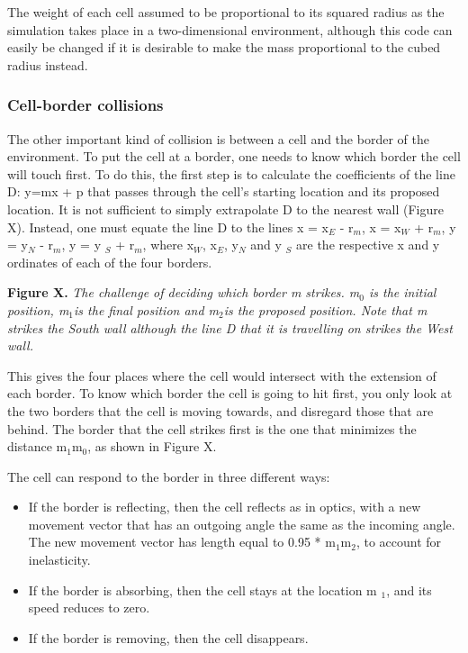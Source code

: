 \documentclass[11.5pt]{article}
\begin{document}
The weight of each cell assumed to be proportional to its squared radius 
as the simulation takes place in a two-dimensional environment, although 
this code can easily be changed if it is desirable to make the mass 
proportional to the cubed radius instead.



\subsubsection{Cell-border collisions}
The other important kind of collision is between a cell and the border 
of the environment. To put the cell at a border, one needs to know which 
border the cell will touch first. To do this, the first step is to 
calculate the coefficients of the line D: y=mx + p that passes through 
the cell's starting location and its proposed location. It is not 
sufficient to simply extrapolate D to the nearest wall (Figure X). 
Instead, one must equate the line D to the lines x = x$_{E}$ - r$_{
m}$, x = x$_{W}$ + r$_{m}$, y = y$_{N}$ - r$_{m}$, y = y
$_{S}$ + r$_{m}$, where x$_{W}$, x$_{E}$, y$_{N}$ and y
$_{S}$ are the respective x and y ordinates of each of the four 
borders.



\begin{figure}[H]
\centering
\end{figure}


{\bfseries Figure X. }{\itshape The challenge of deciding which border m 
strikes. m$_{0}$ is the initial position, m$_{1 }$is the final 
position and m$_{2 }$is the proposed position. Note that m strikes 
the South wall although the line D that it is travelling on strikes the 
West wall.}



This gives the four places where the cell would intersect with the 
extension of each border. To know which border the cell is going to hit 
first, you only look at the two borders that the cell is moving towards, 
and disregard those that are behind. The border that the cell strikes 
first is the one that minimizes the distance m$_{1}$m$_{0}$, as 
shown in Figure X. 



The cell can respond to the border in three different ways: 

\begin{itemize}
\item If the border is reflecting, then the cell reflects as in optics, 
with a new movement vector that has an outgoing angle the same as the 
incoming angle. The new movement vector has length equal to 0.95 * m$_{
1}$m$_{2}$, to account for inelasticity.
\item If the border is absorbing, then the cell stays at the location m
$_{1}$, and its speed reduces to zero.
\item If the border is removing, then the cell disappears.
\end{itemize}
\end{document}
